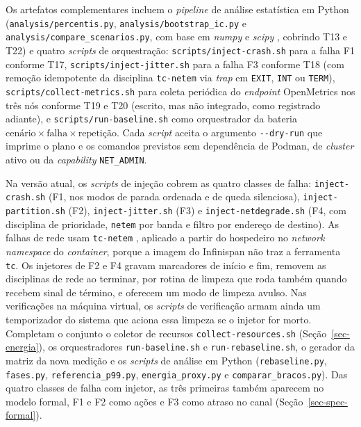 Os artefatos complementares incluem o \emph{pipeline} de análise estatística em Python (\texttt{analysis/percentis.py}, \texttt{analysis/bootstrap\_ic.py} e \texttt{analysis/compare\_scenarios.py}, com base em \emph{numpy} \citep{numpy_harris_2020} e \emph{scipy} \citep{scipy_virtanen_2020}, cobrindo T13 e T22) e quatro \emph{scripts} de orquestração: \texttt{scripts/inject-crash.sh} para a falha F1 conforme T17, \texttt{scripts/inject-jitter.sh} para a falha F3 conforme T18 (com remoção idempotente da disciplina \texttt{tc-netem} via \emph{trap} em \texttt{EXIT}, \texttt{INT} ou \texttt{TERM}), \texttt{scripts/collect-metrics.sh} para coleta periódica do \emph{endpoint} OpenMetrics nos três nós conforme T19 e T20 (escrito, mas não integrado, como registrado adiante), e \texttt{scripts/run-baseline.sh} como orquestrador da bateria $\text{cenário} \times \text{falha} \times \text{repetição}$. Cada \emph{script} aceita o argumento \texttt{-{}-dry-run} que imprime o plano e os comandos previstos sem dependência de Podman, de \emph{cluster} ativo ou da \emph{capability} \texttt{NET\_ADMIN}.

Na versão atual, os \emph{scripts} de injeção cobrem as quatro classes de falha: \texttt{inject-crash.sh} (F1, nos modos de parada ordenada e de queda silenciosa), \texttt{inject-partition.sh} (F2), \texttt{inject-jitter.sh} (F3) e \texttt{inject-netdegrade.sh} (F4, com disciplina de prioridade, \texttt{netem} por banda e filtro por endereço de destino). As falhas de rede usam \texttt{tc-netem} \citep{netem_manpage}, aplicado a partir do hospedeiro no \emph{network namespace} do \emph{container}, porque a imagem do Infinispan não traz a ferramenta \texttt{tc}. Os injetores de F2 e F4 gravam marcadores de início e fim, removem as disciplinas de rede ao terminar, por rotina de limpeza que roda também quando recebem sinal de término, e oferecem um modo de limpeza avulso. Nas verificações na máquina virtual, os \emph{scripts} de verificação armam ainda um temporizador do sistema que aciona essa limpeza se o injetor for morto. Completam o conjunto o coletor de recursos \texttt{collect-resources.sh} (Seção~\ref{sec-energia}), os orquestradores \texttt{run-baseline.sh} e \texttt{run-rebaseline.sh}, o gerador da matriz da nova medição e os \emph{scripts} de análise em Python (\texttt{rebaseline.py}, \texttt{fases.py}, \texttt{referencia\_p99.py}, \texttt{energia\_proxy.py} e \texttt{comparar\_bracos.py}). Das quatro classes de falha com injetor, as três primeiras também aparecem no modelo formal, F1 e F2 como ações e F3 como atraso no canal (Seção~\ref{sec-spec-formal}).

